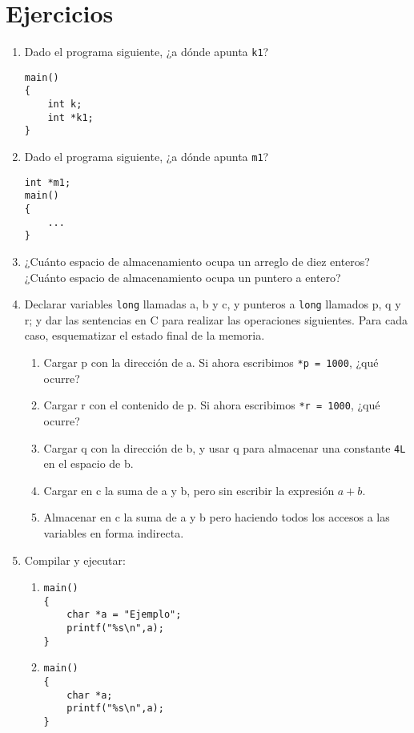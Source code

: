 \section{Ejercicios}
\label{sec:tc-direcciones-ej}
\begin{enumerate}
	\item Dado el programa siguiente, ¿a dónde apunta \texttt{k1}?
\begin{lstlisting}
main()
{
    int k;
    int *k1;
}
\end{lstlisting}
	\item Dado el programa siguiente, ¿a dónde apunta \texttt{m1}?
\begin{lstlisting}
int *m1;
main()
{
    ...
}	
\end{lstlisting}
	\item ¿Cuánto espacio de almacenamiento ocupa un arreglo de diez enteros? ¿Cuánto
espacio de almacenamiento ocupa un puntero a entero?
	\item Declarar variables \texttt{long} llamadas a, b y c, y punteros a \texttt{long} llamados p, q y r; y dar
las sentencias en C para realizar las operaciones siguientes. Para cada caso,
esquematizar el estado final de la memoria.
	\begin{enumerate}[label=\alph*.]
		\item Cargar p con la dirección de a. Si ahora escribimos \lstinline{*p = 1000}, ¿qué
      ocurre?
		\item Cargar r con el contenido de p. Si ahora escribimos \lstinline{*r = 1000}, ¿qué
      ocurre?
		\item Cargar q con la dirección de b, y usar q para almacenar una constante \texttt{4L}
      en el espacio de b.
		\item Cargar en c la suma de a y b, pero sin escribir la expresión $a+b$.
		\item Almacenar en c la suma de a y b pero haciendo todos los accesos a las
      variables en forma indirecta.
	\end{enumerate}
\item Compilar y ejecutar:
\begin{enumerate}[label=\alph*.]
		\item 
\begin{lstlisting}
main()
{
    char *a = "Ejemplo";
    printf("%s\n",a);
}
\end{lstlisting}

\item 
\begin{lstlisting}
main()
{
    char *a;
    printf("%s\n",a);
}
\end{lstlisting}		


\end{enumerate}
\end{enumerate}
